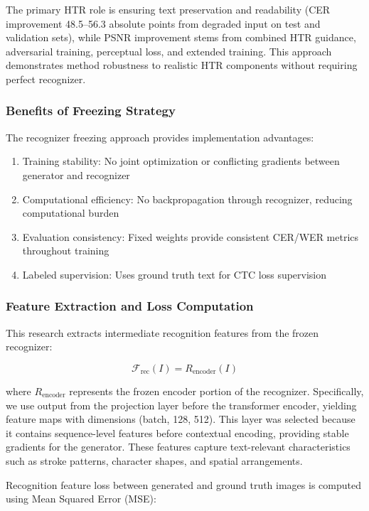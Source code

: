 \documentclass[journal]{IEEEtran}
\begin{document}
The primary HTR role is ensuring text preservation and readability (CER improvement 48.5--56.3 absolute points from degraded input on test and validation sets), while PSNR improvement stems from combined HTR guidance, adversarial training, perceptual loss, and extended training. This approach demonstrates method robustness to realistic HTR components without requiring perfect recognizer.

\subsubsection{Benefits of Freezing Strategy}

The recognizer freezing approach provides implementation advantages:
\begin{enumerate}
    \item Training stability: No joint optimization or conflicting gradients between generator and recognizer
    \item Computational efficiency: No backpropagation through recognizer, reducing computational burden
    \item Evaluation consistency: Fixed weights provide consistent CER/WER metrics throughout training
    \item Labeled supervision: Uses ground truth text for CTC loss supervision
\end{enumerate}

\subsubsection{Feature Extraction and Loss Computation}

This research extracts intermediate recognition features from the frozen recognizer:

\begin{equation}
\mathcal{F}_{\text{rec}}(I) = R_{\text{encoder}}(I)
\end{equation}

\noindent where $R_{\text{encoder}}$ represents the frozen encoder portion of the recognizer. Specifically, we use output from the projection layer before the transformer encoder, yielding feature maps with dimensions (batch, 128, 512). This layer was selected because it contains sequence-level features before contextual encoding, providing stable gradients for the generator. These features capture text-relevant characteristics such as stroke patterns, character shapes, and spatial arrangements.

Recognition feature loss between generated and ground truth images is computed using Mean Squared Error (MSE):
\end{document}
